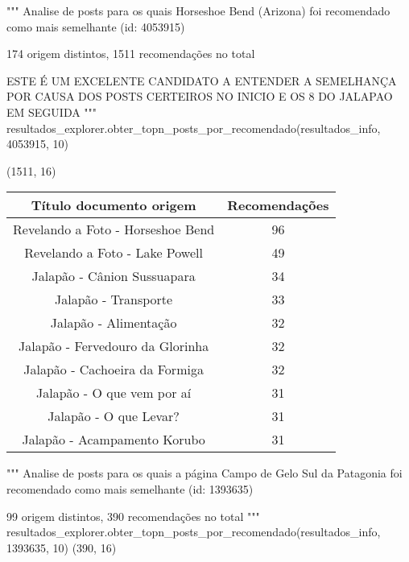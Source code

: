 """
Analise de posts para os quais Horseshoe Bend (Arizona) foi recomendado como mais semelhante (id: 4053915)

174 origem distintos, 1511 recomendações no total

ESTE É UM EXCELENTE CANDIDATO A ENTENDER A SEMELHANÇA POR CAUSA DOS POSTS CERTEIROS NO INICIO E OS 8 DO JALAPAO EM SEGUIDA
"""
resultados\_explorer.obter\_topn\_posts\_por\_recomendado(resultados\_info, 4053915, 10)

(1511, 16)

\begin{center}
    \begin{tabular}{|c|c|}
        \hline
        \textbf{Título documento origem} & \textbf{Recomendações} \\
        \hline
        Revelando a Foto - Horseshoe Bend & 96 \\
        \hline
        Revelando a Foto - Lake Powell & 49 \\
        \hline
        Jalapão - Cânion Sussuapara & 34 \\
        \hline
        Jalapão - Transporte & 33 \\
        \hline
        Jalapão - Alimentação & 32 \\
        \hline
        Jalapão - Fervedouro da Glorinha & 32 \\
        \hline
        Jalapão - Cachoeira da Formiga & 32 \\
        \hline
        Jalapão - O que vem por aí & 31 \\
        \hline
        Jalapão - O que Levar? & 31 \\
        \hline
        Jalapão - Acampamento Korubo & 31 \\
        \hline
    \end{tabular}
\end{center}

"""
Analise de posts para os quais a página Campo de Gelo Sul da Patagonia foi recomendado como mais semelhante (id: 1393635)

99 origem distintos, 390 recomendações no total
"""
resultados\_explorer.obter\_topn\_posts\_por\_recomendado(resultados\_info, 1393635, 10)
(390, 16)

